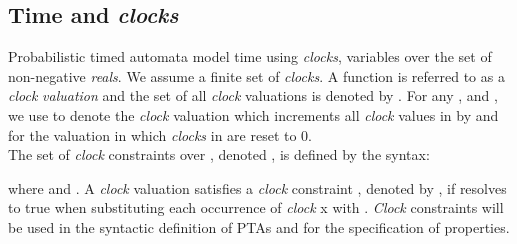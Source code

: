 \subsection{Time and \textit{clocks}}
Probabilistic timed automata model time using \textit{\textit{clocks}}, variables over the set  of non-negative \textit{reals}. We assume a finite set  of \textit{clocks}. A function  is referred to as a \textit{clock} \textit{valuation} and the set of all \textit{clock} valuations is denoted by . For any ,  and , we use  to denote the \textit{clock} valuation which increments all \textit{clock} values in  by  and  for the valuation in which \textit{clocks} in  are reset to 0. \\
The set of \textit{clock} constraints over  , denoted , is defined by the syntax: \begin{center} \end{center}
where  and . A \textit{clock} valuation  satisfies a \textit{clock} constraint , denoted by , if  resolves to true when substituting each occurrence of \textit{clock} x with . \textit{Clock} constraints will be used in the syntactic definition of PTAs and for the specification of properties.\\

